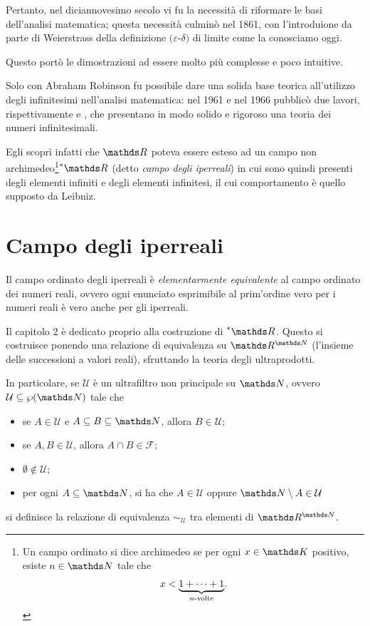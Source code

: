 Pertanto, nel diciannovesimo secolo vi fu la necessità di riformare le basi dell'analisi matematica; questa necessità culminò nel 1861, con l'introduione da parte di Weierstrass della definizione $ (\varepsilon$-$\delta) $ di limite come la conosciamo oggi. 

Questo portò le dimostrazioni ad essere molto più complesse e poco intuitive. 

Solo con Abraham Robinson fu possibile dare una solida base teorica all'utilizzo degli infinitesimi nell'analisi matematica:  nel 1961 e nel 1966 pubblicò due lavori, rispettivamente \cite{robinson_non-standard_1961} e \cite{robinson_non-standard_1966}, che presentano in modo solido e rigoroso una teoria dei numeri infinitesimali.

Egli scoprì infatti che $ \R $ poteva essere esteso ad un campo non archimedeo\footnote{
    Un campo ordinato si dice archimedeo se per ogni $ x \in \K $ positivo, esiste $ n \in \N $ tale che\[x<\underset{n\text{-volte}}{\underbrace{1+\dots+1}}.\]
}$\starR$ (detto \emph{campo degli iperreali}) in cui sono quindi presenti degli elementi infiniti e degli elementi infinitesi, il cui comportamento è quello supposto da Leibniz.

\section*{Campo degli iperreali}

Il campo ordinato degli iperreali è \emph{elementarmente equivalente} al campo ordinato dei numeri reali, ovvero ogni enunciato esprimibile al prim'ordine vero per i numeri reali è vero anche per gli iperreali. 

Il capitolo 2 è dedicato proprio alla costruzione di $ \starR $. Questo si costruisce ponendo una relazione di equivalenza su $ \R^{\N} $ (l'insieme delle successioni a valori reali), sfruttando la teoria degli ultraprodotti. 

In particolare, se $ \mathcal{U} $ è un ultrafiltro non principale su $ \N $, ovvero $ \mathcal{U} \subseteq \parti{\N} $ tale che \begin{itemize}
    \item se $ A \in \mathcal{U} $ e $ A \subseteq B \subseteq \N $, allora $ B \in \mathcal{U} $;
    \item se $ A,B \in \mathcal{U} $, allora $ A \cap B \in \mathcal{F} $; 
    \item $ \emptyset \notin \mathcal{U} $;
    \item per ogni $ A \subseteq \N $, si ha che $ A \in \mathcal{U} $ oppure $ \N \setminus A \in \mathcal{U} $
\end{itemize}si definisce la relazione di equivalenza $ \sim_{\mathcal{U}}  $ tra elementi di $ \R^{\N} $. 

